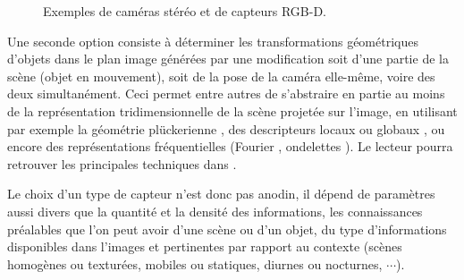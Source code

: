 \begin{figure}[!ht]
  \centering
\hfill
    \caption{\footnotesize{Exemples de cam\'eras st\'er\'eo et de capteurs RGB-D.}}
\label{chap01:fig02}
\end{figure}

Une seconde option consiste \`a d\'eterminer les transformations 
g\'eom\'etriques d'ob\-jets dans le plan image g\'en\'er\'ees par une 
modification soit d'une partie de la sc\`ene (objet en mouvement), soit de la 
pose de la cam\'era elle-m\^eme, voire des deux simultan\'ement. Ceci permet 
entre autres de s'abstraire en partie au moins de la repr\'esentation 
tridimensionnelle de la sc\`ene projet\'ee sur l'image, en utilisant par exemple 
la g\'eom\'etrie pl\"uckerienne \cite{andreff:inria-00072393}, des descripteurs 
locaux ou globaux \cite{latuan2010}, ou encore des repr\'esentations 
fr\'equentielles (Fourier \cite{chari2008}, ondelettes \cite{ramosvelasco2012}). 
Le lecteur pourra retrouver les principales techniques dans \cite{marchand2005}.

Le choix d'un type de capteur n'est donc pas anodin, il d\'epend de 
param\`etres aussi divers que la quantit\'e et la densit\'e des informations, 
les connaissances pr\'ealables que l'on peut avoir d'une sc\`ene ou d'un objet, 
du type d'informations disponibles dans l'images et pertinentes par rapport au 
contexte (sc\`enes homog\`enes ou textur\'ees, mobiles ou statiques, diurnes ou 
nocturnes, $\cdots$).

